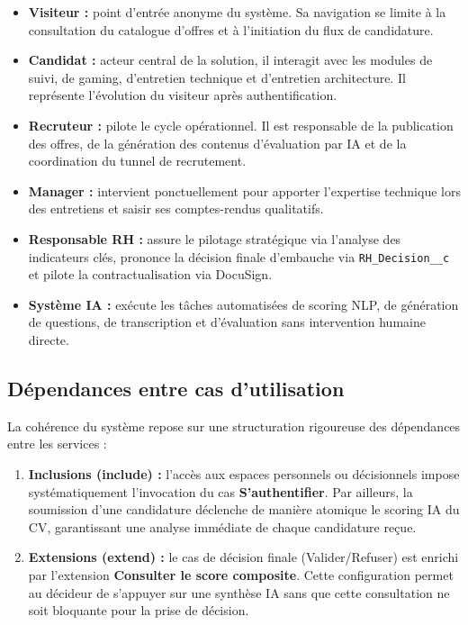 \begin{itemize}
    \item \textbf{Visiteur :} point d'entrée anonyme du système. Sa navigation se limite à la consultation du catalogue d'offres et à l'initiation du flux de candidature.
    \item \textbf{Candidat :} acteur central de la solution, il interagit avec les modules de suivi, de gaming, d'entretien technique et d'entretien architecture. Il représente l'évolution du visiteur après authentification.
    \item \textbf{Recruteur :} pilote le cycle opérationnel. Il est responsable de la publication des offres, de la génération des contenus d'évaluation par IA et de la coordination du tunnel de recrutement.
    \item \textbf{Manager :} intervient ponctuellement pour apporter l'expertise technique lors des entretiens et saisir ses comptes-rendus qualitatifs.
    \item \textbf{Responsable RH :} assure le pilotage stratégique via l'analyse des indicateurs clés, prononce la décision finale d'embauche via \texttt{RH\_Decision\_\_c} et pilote la contractualisation via DocuSign.
    \item \textbf{Système IA :} exécute les tâches automatisées de scoring NLP, de génération de questions, de transcription et d'évaluation sans intervention humaine directe.
\end{itemize}

\subsection{Dépendances entre cas d'utilisation}

La cohérence du système repose sur une structuration rigoureuse des dépendances entre les services :

\begin{enumerate}
    \item \textbf{Inclusions (\guillemotleft include\guillemotright) :} l'accès aux espaces personnels ou décisionnels impose systématiquement l'invocation du cas \textbf{S'authentifier}. Par ailleurs, la soumission d'une candidature déclenche de manière atomique le scoring IA du CV, garantissant une analyse immédiate de chaque candidature reçue.
    
    \item \textbf{Extensions (\guillemotleft extend\guillemotright) :} le cas de décision finale (Valider/Refuser) est enrichi par l'extension \textbf{Consulter le score composite}. Cette configuration permet au décideur de s'appuyer sur une synthèse IA sans que cette consultation ne soit bloquante pour la prise de décision.
\end{enumerate}

